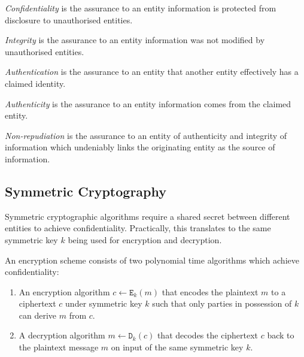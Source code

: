 \begin{defn}[Confidentiality]
\label{def:confidentiality}
 \textit{Confidentiality} is the assurance to an entity information is protected from disclosure to unauthorised entities.
\end{defn}

\begin{defn}[Integrity]
\label{def:integrity}
 \textit{Integrity} is the assurance to an entity information was not modified by unauthorised entities.
\end{defn}

\begin{defn}[Authentication]
\label{def:authentication}
 \textit{Authentication} is the assurance to an entity that another entity effectively has a claimed identity.
\end{defn}

\begin{defn}[Authenticity]
\label{def:authenticity}
 \textit{Authenticity} is the assurance to an entity information comes from the claimed entity.
\end{defn}

\begin{defn}
\label{def:non-repudiation}
 \textit{Non-repudiation} is the assurance to an entity of authenticity and integrity of information which undeniably links the originating entity as the source of information. 
\end{defn}

\subsection{Symmetric Cryptography}
Symmetric cryptographic algorithms require a shared secret between different entities to achieve confidentiality. Practically, this translates to the same symmetric key $k$ being used for encryption and decryption.

\begin{defn}
\label{def:encryption_scheme}
 An encryption scheme consists of two polynomial time algorithms which achieve confidentiality:
 \begin{enumerate}
   \item An encryption algorithm $c \leftarrow \mathtt{E}_k \left( m \right)$ that encodes the plaintext $m$ to a ciphertext $c$ under symmetric key $k$ such that only parties in possession of $k$ can derive $m$ from $c$.
   \item A decryption algorithm $m \leftarrow \mathtt{D}_k \left( c \right)$ that decodes the ciphertext $c$ back to the plaintext message $m$ on input of the same symmetric key $k$.
 \end{enumerate}
\end{defn}

